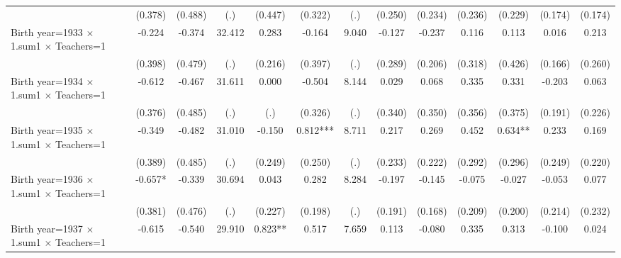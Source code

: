 {\begin{tabular}{l*{12}{c}}
                    &     (0.378)   &     (0.488)   &         (.)   &     (0.447)   &     (0.322)   &         (.)   &     (0.250)   &     (0.234)   &     (0.236)   &     (0.229)   &     (0.174)   &     (0.174)   \\
Birth year=1933 $\times$ 1.sum1 $\times$ Teachers=1&      -0.224   &      -0.374   &      32.412   &       0.283   &      -0.164   &       9.040   &      -0.127   &      -0.237   &       0.116   &       0.113   &       0.016   &       0.213   \\
                    &     (0.398)   &     (0.479)   &         (.)   &     (0.216)   &     (0.397)   &         (.)   &     (0.289)   &     (0.206)   &     (0.318)   &     (0.426)   &     (0.166)   &     (0.260)   \\
Birth year=1934 $\times$ 1.sum1 $\times$ Teachers=1&      -0.612   &      -0.467   &      31.611   &       0.000   &      -0.504   &       8.144   &       0.029   &       0.068   &       0.335   &       0.331   &      -0.203   &       0.063   \\
                    &     (0.376)   &     (0.485)   &         (.)   &         (.)   &     (0.326)   &         (.)   &     (0.340)   &     (0.350)   &     (0.356)   &     (0.375)   &     (0.191)   &     (0.226)   \\
Birth year=1935 $\times$ 1.sum1 $\times$ Teachers=1&      -0.349   &      -0.482   &      31.010   &      -0.150   &       0.812***&       8.711   &       0.217   &       0.269   &       0.452   &       0.634** &       0.233   &       0.169   \\
                    &     (0.389)   &     (0.485)   &         (.)   &     (0.249)   &     (0.250)   &         (.)   &     (0.233)   &     (0.222)   &     (0.292)   &     (0.296)   &     (0.249)   &     (0.220)   \\
Birth year=1936 $\times$ 1.sum1 $\times$ Teachers=1&      -0.657*  &      -0.339   &      30.694   &       0.043   &       0.282   &       8.284   &      -0.197   &      -0.145   &      -0.075   &      -0.027   &      -0.053   &       0.077   \\
                    &     (0.381)   &     (0.476)   &         (.)   &     (0.227)   &     (0.198)   &         (.)   &     (0.191)   &     (0.168)   &     (0.209)   &     (0.200)   &     (0.214)   &     (0.232)   \\
Birth year=1937 $\times$ 1.sum1 $\times$ Teachers=1&      -0.615   &      -0.540   &      29.910   &       0.823** &       0.517   &       7.659   &       0.113   &      -0.080   &       0.335   &       0.313   &      -0.100   &       0.024   \\

\end{tabular}}

